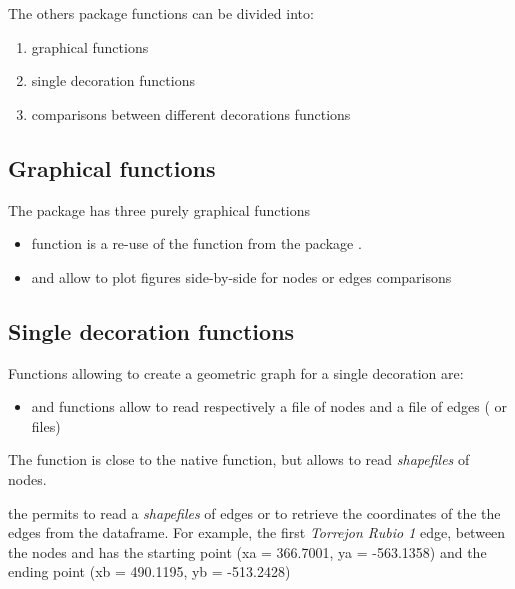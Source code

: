 \documentclass[article]{jss}\usepackage{knitr}
\begin{document}
The others  package functions can be divided into:
\begin{enumerate}
 \item graphical functions
 \item single decoration functions
 \item comparisons between different decorations functions
\end{enumerate}

\subsection{Graphical functions} \label{sec:functions_gr}

The  package has three purely graphical functions
\begin{itemize}
\setlength\itemsep{.1em}
\item {} function is a re-use of the  function from the  package \citep{Snow20}.
\item {} and  allow to plot figures side-by-side for nodes or edges comparisons
\end{itemize}

\subsection{Single decoration functions} \label{sec:functions_one}

Functions allowing to create a geometric graph for a single decoration are:

\begin{itemize}
\setlength\itemsep{.1em}
  \item {} and  functions allow to read respectively a file of nodes and a file of edges ( or  files)
\end{itemize}

The  function is close to the native   function, but allows to read \emph{shapefiles} of nodes.

the  permits to read a \emph{shapefiles} of edges or to retrieve the coordinates of the the edges from the  dataframe. For example, the first \emph{Torrejon Rubio 1} edge, between the nodes  and  has
the starting point (xa = 366.7001, ya = -563.1358) and the ending point (xb = 490.1195, yb = -513.2428)
\end{document}
